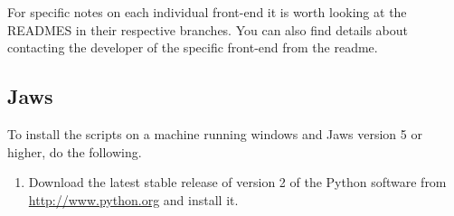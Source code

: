 \documentclass[12pt,a4paper]{report}
\begin{document}
For specific notes on each individual front-end it is worth looking at the
READMES in their respective branches. You can also find details about
contacting the developer of the specific front-end from the readme.

\subsection{Jaws}
\label{subsubchap-jaws}

To install the scripts on a machine running windows and Jaws
version 5 or higher, do the following.

\begin{enumerate}
\item Download the latest stable release of version 2 of the Python software from
\url{http://www.python.org} and install it.


\end{enumerate}
\end{document}
